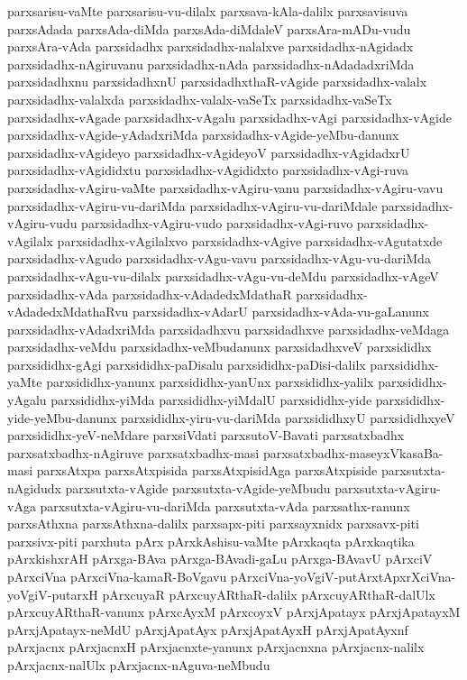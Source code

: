 {parxsarisu-vaMte
parxsarisu-vu-dilalx
parxsava-kAla-dalilx
parxsavisuva
parxsAdada
parxsAda-diMda
parxsAda-diMdaleV
parxsAra-mADu-vudu
parxsAra-vAda
parxsidadhx
parxsidadhx-nalalxve
parxsidadhx-nAgidadx
parxsidadhx-nAgiruvanu
parxsidadhx-nAda
parxsidadhx-nAdadadxriMda
parxsidadhxnu
parxsidadhxnU
parxsidadhxthaR-vAgide
parxsidadhx-valalx
parxsidadhx-valalxda
parxsidadhx-valalx-vaSeTx
parxsidadhx-vaSeTx
parxsidadhx-vAgade
parxsidadhx-vAgalu
parxsidadhx-vAgi
parxsidadhx-vAgide
parxsidadhx-vAgide-yAdadxriMda
parxsidadhx-vAgide-yeMbu-danunx
parxsidadhx-vAgideyo
parxsidadhx-vAgideyoV
parxsidadhx-vAgidadxrU
parxsidadhx-vAgididxtu
parxsidadhx-vAgididxto
parxsidadhx-vAgi-ruva
parxsidadhx-vAgiru-vaMte
parxsidadhx-vAgiru-vanu
parxsidadhx-vAgiru-vavu
parxsidadhx-vAgiru-vu-dariMda
parxsidadhx-vAgiru-vu-dariMdale
parxsidadhx-vAgiru-vudu
parxsidadhx-vAgiru-vudo
parxsidadhx-vAgi-ruvo
parxsidadhx-vAgilalx
parxsidadhx-vAgilalxvo
parxsidadhx-vAgive
parxsidadhx-vAgutatxde
parxsidadhx-vAgudo
parxsidadhx-vAgu-vavu
parxsidadhx-vAgu-vu-dariMda
parxsidadhx-vAgu-vu-dilalx
parxsidadhx-vAgu-vu-deMdu
parxsidadhx-vAgeV
parxsidadhx-vAda
parxsidadhx-vAdadedxMdathaR
parxsidadhx-vAdadedxMdathaRvu
parxsidadhx-vAdarU
parxsidadhx-vAda-vu-gaLanunx
parxsidadhx-vAdadxriMda
parxsidadhxvu
parxsidadhxve
parxsidadhx-veMdaga
parxsidadhx-veMdu
parxsidadhx-veMbudanunx
parxsidadhxveV
parxsididhx
parxsididhx-gAgi
parxsididhx-paDisalu
parxsididhx-paDisi-dalilx
parxsididhx-yaMte
parxsididhx-yanunx
parxsididhx-yanUnx
parxsididhx-yalilx
parxsididhx-yAgalu
parxsididhx-yiMda
parxsididhx-yiMdalU
parxsididhx-yide
parxsididhx-yide-yeMbu-danunx
parxsididhx-yiru-vu-dariMda
parxsididhxyU
parxsididhxyeV
parxsididhx-yeV-neMdare
parxsiVdati
parxsutoV-Bavati
parxsatxbadhx
parxsatxbadhx-nAgiruve
parxsatxbadhx-masi
parxsatxbadhx-maseyxVkasaBa-masi
parxsAtxpa
parxsAtxpisida
parxsAtxpisidAga
parxsAtxpiside
parxsutxta-nAgidudx
parxsutxta-vAgide
parxsutxta-vAgide-yeMbudu
parxsutxta-vAgiru-vAga
parxsutxta-vAgiru-vu-dariMda
parxsutxta-vAda
parxsathx-ranunx
parxsAthxna
parxsAthxna-dalilx
parxsapx-piti
parxsayxnidx
parxsavx-piti
parxsivx-piti
parxhuta
pArx
pArxkAshisu-vaMte
pArxkaqta
pArxkaqtika
pArxkishxrAH
pArxga-BAva
pArxga-BAvadi-gaLu
pArxga-BAvavU
pArxciV
pArxciVna
pArxciVna-kamaR-BoVgavu
pArxciVna-yoVgiV-putArxtApxrXciVna-yoVgiV-putarxH
pArxcuyaR
pArxcuyARthaR-dalilx
pArxcuyARthaR-dalUlx
pArxcuyARthaR-vanunx
pArxcAyxM
pArxcoyxV
pArxjApatayx
pArxjApatayxM
pArxjApatayx-neMdU
pArxjApatAyx
pArxjApatAyxH
pArxjApatAyxnf
pArxjacnx
pArxjacnxH
pArxjacnxte-yanunx
pArxjacnxna
pArxjacnx-nalilx
pArxjacnx-nalUlx
pArxjacnx-nAguva-neMbudu
}
